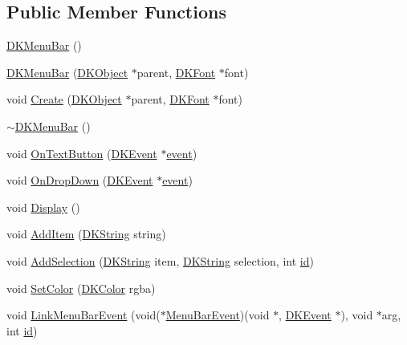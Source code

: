 \subsection*{Public Member Functions}
\begin{DoxyCompactItemize}
\item 
\hyperlink{class_d_k_menu_bar_af155f227a0536cfd7d5e88267d797548}{D\-K\-Menu\-Bar} ()
\item 
\hyperlink{class_d_k_menu_bar_aefd5b739974e615bfced77a9637a5bad}{D\-K\-Menu\-Bar} (\hyperlink{class_d_k_object}{D\-K\-Object} $\ast$parent, \hyperlink{class_d_k_font}{D\-K\-Font} $\ast$font)
\item 
void \hyperlink{class_d_k_menu_bar_a5a28f620f8353ef26ab16de443809b97}{Create} (\hyperlink{class_d_k_object}{D\-K\-Object} $\ast$parent, \hyperlink{class_d_k_font}{D\-K\-Font} $\ast$font)
\item 
\hyperlink{class_d_k_menu_bar_ab54a8320610a2580187372c227883465}{$\sim$\-D\-K\-Menu\-Bar} ()
\item 
void \hyperlink{class_d_k_menu_bar_a0b04045167db16dbcda476be40692d2e}{On\-Text\-Button} (\hyperlink{class_d_k_event}{D\-K\-Event} $\ast$\hyperlink{class_d_k_event_a3deebb932ed734363c4ece87971bc45f}{event})
\item 
void \hyperlink{class_d_k_menu_bar_a31eca23e616ee589c10d19759aab2593}{On\-Drop\-Down} (\hyperlink{class_d_k_event}{D\-K\-Event} $\ast$\hyperlink{class_d_k_event_a3deebb932ed734363c4ece87971bc45f}{event})
\item 
void \hyperlink{class_d_k_menu_bar_a3bbd4a8798ee36e81a41c96c2c417b25}{Display} ()
\item 
void \hyperlink{class_d_k_menu_bar_a0e9e4e19204da16c7909e3b52e9cd313}{Add\-Item} (\hyperlink{_d_k_string_8h_ac168e8555ceba18e1a2919b21976bc84}{D\-K\-String} string)
\item 
void \hyperlink{class_d_k_menu_bar_ac15e9af38dedc588e41b6867d05baf35}{Add\-Selection} (\hyperlink{_d_k_string_8h_ac168e8555ceba18e1a2919b21976bc84}{D\-K\-String} item, \hyperlink{_d_k_string_8h_ac168e8555ceba18e1a2919b21976bc84}{D\-K\-String} selection, int \hyperlink{class_d_k_event_a46877918e12fcb3b2c8988379b6fa6fa}{id})
\item 
void \hyperlink{class_d_k_menu_bar_a4833d68d967abe39484f414e7e4a2d63}{Set\-Color} (\hyperlink{class_d_k_color}{D\-K\-Color} rgba)
\item 
void \hyperlink{class_d_k_menu_bar_ab28ae2a95e3a2aa5b8745cb1553e16e2}{Link\-Menu\-Bar\-Event} (void($\ast$\hyperlink{class_d_k_event_abdfd544e92336d126c9ce325c8669191}{Menu\-Bar\-Event})(void $\ast$, \hyperlink{class_d_k_event}{D\-K\-Event} $\ast$), void $\ast$arg, int \hyperlink{class_d_k_event_a46877918e12fcb3b2c8988379b6fa6fa}{id})
\end{DoxyCompactItemize}
